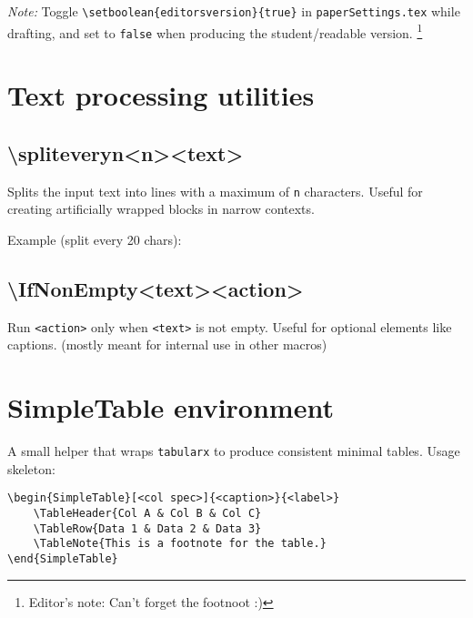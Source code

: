 \documentclass[nonacm, sigconf, balance=true]{acmart}
\begin{document}
    \noindent\textit{Note:} Toggle \verb|\setboolean{editorsversion}{true}| in \texttt{paperSettings.tex} while drafting, and set to \verb|false| when producing the student/readable version. \textcolor{red!70!black}{\footnote{\textcolor{red!70!black}{Editor's note: Can't forget the footnoot :)}}}%



    \section{Text processing utilities}

    \subsection{\textbackslash spliteveryn{<n>}{<text>}}
    Splits the input text into lines with a maximum of \verb|n| characters. Useful for creating artificially wrapped blocks in narrow contexts.

    \smallskip
    \noindent Example (split every 20 chars):\\

    \subsection{\textbackslash IfNonEmpty{<text>}{<action>}}
    Run \verb|<action>| only when \verb|<text>| is not empty. Useful for optional elements like captions. (mostly meant for internal use in other macros)



    \section{SimpleTable environment}
    A small helper that wraps \texttt{tabularx} to produce consistent minimal tables. Usage skeleton:

    \begin{verbatim}
\begin{SimpleTable}[<col spec>]{<caption>}{<label>}
    \TableHeader{Col A & Col B & Col C}
    \TableRow{Data 1 & Data 2 & Data 3}
    \TableNote{This is a footnote for the table.}
\end{SimpleTable}
    \end{verbatim}
\end{document}
